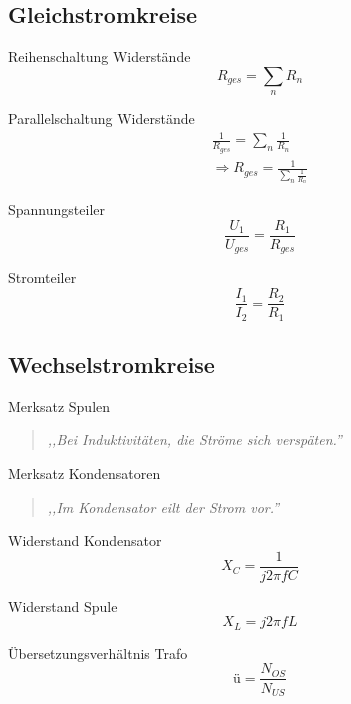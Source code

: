 \documentclass[11pt, a4paper, final, fleqn, twocolumn]{article}
\numberwithin{equation}{subsection}
\begin{document}
\subsection{Gleichstromkreise}

Reihenschaltung Widerstände
\begin{equation}
    R_{ges} = \sum_n R_n
\end{equation}

\noindent Parallelschaltung Widerstände
\begin{equation}
\begin{split}
    \frac{1}{R_{ges}} = \sum_n \frac{1}{R_n} \\
    \Rightarrow R_{ges} = \frac{1}{\sum_n \frac{1}{R_n}}
\end{split}
\end{equation}

\noindent Spannungsteiler
\begin{equation}
    \frac{U_1}{U_{ges}} = \frac{R_1}{R_{ges}}
\end{equation}

\noindent Stromteiler
\begin{equation}
    \frac{I_1}{I_2} = \frac{R_2}{R_1}
\end{equation}


\subsection{Wechselstromkreise}

Merksatz Spulen
\begin{quote}
    \textit{,,Bei Induktivitäten, die Ströme sich verspäten.''}
\end{quote}

\noindent Merksatz Kondensatoren
\begin{quote}
    \textit{,,Im Kondensator eilt der Strom vor.''}
\end{quote}

\noindent Widerstand Kondensator
\begin{equation}
    X_C = \frac{1}{j 2\pi f C}
\end{equation}

\noindent Widerstand Spule
\begin{equation}
    X_L = j 2\pi f L
\end{equation}

\noindent Übersetzungsverhältnis Trafo
\begin{equation}
    \text{ü} = \frac{N_{OS}}{N_{US}}
\end{equation}
\end{document}
